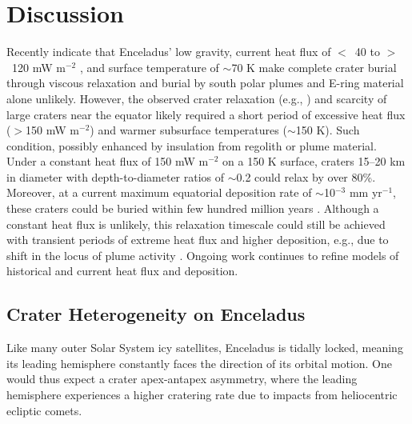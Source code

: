 \documentclass[preprint,11pt,3p,times,authoryear]{elsarticle}
\begin{document}
{%

\section{Discussion}

Recently \citet{Bland2012,Martin2023} indicate that Enceladus’ low gravity, current heat flux of $<$~40 to $>$~120 mW m$^{-2}$ \citep{Cadek2019,Kinczyk2024}, and surface temperature of $\sim$70 K make complete crater burial through viscous relaxation and burial by south polar plumes and E-ring material alone unlikely. However, the observed crater relaxation (e.g., \citealt{Bland2012}) and scarcity of large craters near the equator likely required a short period of excessive heat flux ($>$150 mW m$^{-2}$) and warmer subsurface temperatures ($\sim$150 K). Such condition, possibly enhanced by insulation from regolith or plume material. Under a constant heat flux of 150 mW m$^{-2}$ on a 150 K surface, craters 15–20 km in diameter with depth-to-diameter ratios of $\sim$0.2 could relax by over 80\%. Moreover, at a current maximum equatorial deposition rate of $\sim$10$^{-3}$ mm yr$^{-1}$, these craters could be buried within few hundred million years \citep{Bland2012}. Although a constant heat flux is unlikely, this relaxation timescale could still be achieved with transient periods of extreme heat flux and higher deposition, e.g., due to shift in the locus of plume activity \citep{Bland2012}. Ongoing work continues to refine models of historical and current heat flux and deposition.


\subsection{Crater Heterogeneity on Enceladus}
\label{sub:hetero}
Like many outer Solar System icy satellites, Enceladus is tidally locked, meaning its leading hemisphere constantly faces the direction of its orbital motion. One would thus expect a crater apex-antapex asymmetry, where the leading hemisphere experiences a higher cratering rate due to impacts from heliocentric ecliptic comets.\\

}
\end{document}
